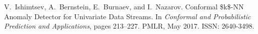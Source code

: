 \documentclass{resume} %
\begin{document}
{\begin{thebibliography}{10}
V.~Ishimtsev, A.~Bernstein, E.~Burnaev, and I.~Nazarov.
\newblock Conformal \$k\$-{NN} {Anomaly} {Detector} for {Univariate} {Data}
  {Streams}.
\newblock In \emph{Conformal and {Probabilistic} {Prediction} and
  {Applications}}, pages 213--227. PMLR, May 2017.
\newblock ISSN: 2640-3498.

\end{thebibliography}

}





\end{document}
